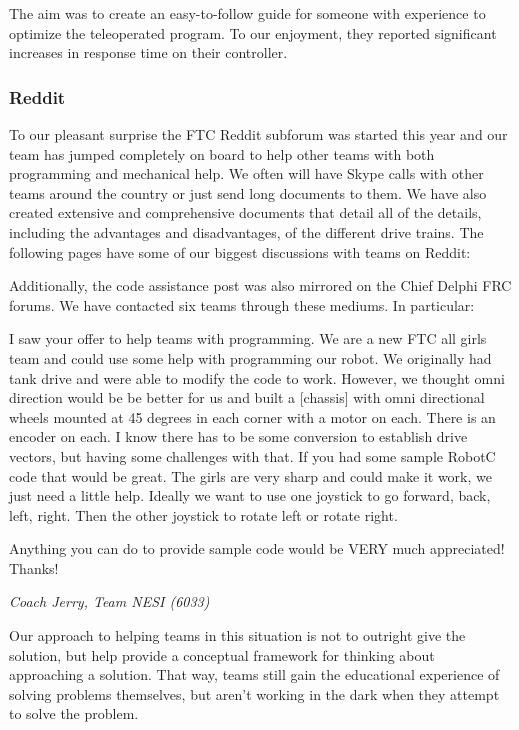 

The aim was to create an easy-to-follow guide for someone with experience to optimize the teleoperated program. To our enjoyment, they reported significant increases in response time on their controller.

\subsubsection{Reddit}
To our pleasant surprise the FTC Reddit subforum was started this year and our team has jumped completely on board to help other teams with both programming and mechanical help. We often will have Skype calls with other teams around the country or just send long documents to them. We have also created extensive and comprehensive documents that detail all of the details, including the advantages and disadvantages, of the different drive trains. The following pages have some of our biggest discussions with teams on Reddit:





Additionally, the code assistance post was also mirrored on the Chief Delphi FRC forums. We have contacted six teams through these mediums. In particular:

\begin{fancyquotes}
I saw your offer to help teams with programming. We are a new FTC all girls team and could use some help with programming our robot. We originally had tank drive and were able to modify the code to work. However, we thought omni direction would be be better for us and built a [chassis] with omni directional wheels mounted at 45 degrees in each corner with a motor on each. There is an encoder on each. I know there has to be some conversion to establish drive vectors, but having some challenges with that. If you had some sample RobotC code that would be great. The girls are very sharp and could make it work, we just need a little help. Ideally we want to use one joystick to go forward, back, left, right. Then the other joystick to rotate left or rotate right.
 
Anything you can do to provide sample code would be VERY much appreciated! Thanks!

\textit{Coach Jerry, Team NESI (6033)}
\end{fancyquotes}

Our approach to helping teams in this situation is not to outright give the solution, but help provide a conceptual framework for thinking about approaching a solution. That way, teams still gain the educational experience of solving problems themselves, but aren't working in the dark when they attempt to solve the problem.

